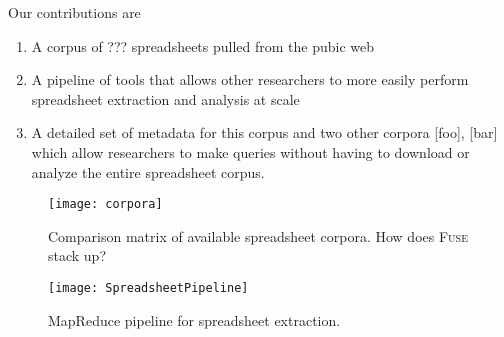 \documentclass[conference]{IEEEtran}
\begin{document}
Our contributions are 
\begin{enumerate}
\item A corpus of ??? spreadsheets pulled from the pubic web
\item A pipeline of tools that allows other researchers to more easily perform spreadsheet extraction and analysis at scale
\item A detailed set of metadata for this corpus and two other corpora [foo], [bar]  which allow researchers to make queries without having to download or analyze the entire spreadsheet corpus.  
\end{enumerate}


\begin{figure}[!t]
\centering
\texttt{[image: corpora]}
\caption{Comparison matrix of available spreadsheet corpora. How does \textsc{Fuse} stack up?}
\label{fig:corpora}
\end{figure}

\begin{figure}[!t]
\centering
\texttt{[image: SpreadsheetPipeline]}
\caption{MapReduce pipeline for spreadsheet extraction.}
\label{fig:mrpipeline}
\end{figure}

\end{document}
